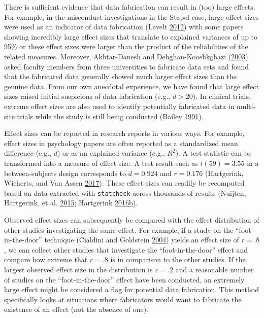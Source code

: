 \documentclass[a5paper]{book}
\begin{document}
There is sufficient evidence that data fabrication can result in (too)
large effects. For example, in the misconduct investigations in the
Stapel case, large effect sizes were used as an indicator of data
fabrication (Levelt \protect\hyperlink{ref-Levelt2012}{2012}) with some
papers showing incredibly large effect sizes that translate to explained
variances of up to 95\% or these effect sizes were larger than the
product of the reliabilities of the related measures. Moreover,
Akhtar-Danesh and Dehghan-Kooshkghazi
(\protect\hyperlink{ref-doi:10.1186ux2f1471-2288-3-18}{2003}) asked
faculty members from three universities to fabricate data sets and found
that the fabricated data generally showed much larger effect sizes than
the genuine data. From our own anecdotal experience, we have found that
large effect sizes raised initial suspicions of data fabrication (e.g.,
\(d>20\)). In clinical trials, extreme effect sizes are also used to
identify potentially fabricated data in multi-site trials while the
study is still being conducted (Bailey
\protect\hyperlink{ref-doi:10.1016ux2f0197-24569190037-M}{1991}).

Effect sizes can be reported in research reports in various ways. For
example, effect sizes in psychology papers are often reported as a
standardized mean difference (e.g., \(d\)) or as an explained variance
(e.g., \(R^2\)). A test statistic can be transformed into a measure of
effect size. A test result such as \(t( 59)=3.55\) in a between-subjects
design corresponds to \(d=0.924\) and \(r=0.176\) (Hartgerink, Wicherts,
and Van Assen \protect\hyperlink{ref-doi:10.1525ux2fcollabra.71}{2017}).
These effect sizes can readily be recomputed based on data extracted
with \texttt{statcheck} across thousands of results (Nuijten,
Hartgerink, et al.
\protect\hyperlink{ref-doi:10.3758ux2fs13428-015-0664-2}{2015};
Hartgerink
\protect\hyperlink{ref-doi:10.3390ux2fdata1030014}{2016}\protect\hyperlink{ref-doi:10.3390ux2fdata1030014}{b}).

Observed effect sizes can subsequently be compared with the effect
distribution of other studies investigating the same effect. For
example, if a study on the \enquote{foot-in-the-door} technique
(Cialdini and Goldstein
\protect\hyperlink{ref-doi:10.1146ux2fannurev.psych.55.090902.142015}{2004})
yields an effect size of \(r=.8\), we can collect other studies that
investigate the \enquote{foot-in-the-door} effect and compare how
extreme that \(r=.8\) is in comparison to the other studies. If the
largest observed effect size in the distribution is \(r=.2\) and a
reasonable number of studies on the \enquote{foot-in-the-door} effect
have been conducted, an extremely large effect might be considered a
flag for potential data fabrication. This method specifically looks at
situations where fabricators would want to fabricate the existence of an
effect (not the absence of one).
\end{document}

